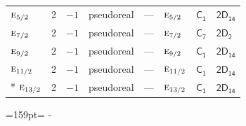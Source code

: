 \documentclass[10pt,a4paper]{article}
\newcommand{\needspace}[1]{\par\penalty-100\begingroup\dimen0=#1\relax\dimen2=\pagegoal
  \advance\dimen2-\pagetotal\ifdim\dimen0>\dimen2\relax\ifdim\dimen2>0pt\vfil\break\fi\fi
  \endgroup}
\numberwithin{equation}{section}
\newcommand{\grp}[1]{\mathsf{#1}}
\newcommand{\irr}[1]{\text{\normalfont\scshape #1}}
\begin{document}
{\begin{longtable}{@{}lrrlllll@{}}
$\irr{e}_{5/2}$ & 2 & $-1$ & pseudoreal & --- & $\irr{e}_{5/2}$ & \href{C1.pdf}{$\grp{C_{1}}$} & $\grp{2D_{14}}$\\
$\irr{e}_{7/2}$ & 2 & $-1$ & pseudoreal & --- & $\irr{e}_{7/2}$ & \href{C7.pdf}{$\grp{C_{7}}$} & \href{2D2.pdf}{$\grp{2D_{2}}$}\\
$\irr{e}_{9/2}$ & 2 & $-1$ & pseudoreal & --- & $\irr{e}_{9/2}$ & \href{C1.pdf}{$\grp{C_{1}}$} & $\grp{2D_{14}}$\\
$\irr{e}_{11/2}$ & 2 & $-1$ & pseudoreal & --- & $\irr{e}_{11/2}$ & \href{C1.pdf}{$\grp{C_{1}}$} & $\grp{2D_{14}}$\\*
$\irr{e}_{13/2}$ & 2 & $-1$ & pseudoreal & --- & $\irr{e}_{13/2}$ & \href{C1.pdf}{$\grp{C_{1}}$} & $\grp{2D_{14}}$\\
\bottomrule\end{longtable}}
\needspace{159pt}
\end{document}
